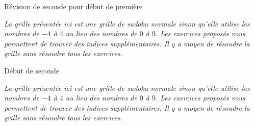 \documentclass[a4paper,12pt]{book}
\newcommand{\IntroSudoku}[1]{
\begin{center}
    {\large #1}

    \emph{La grille présentée ici est une grille de sudoku normale sinon qu'elle utilise les nombres de \( -4\) à \( 4\) au lieu des nombres de \( 0\) à \( 9\). Les exercices proposés vous permettent de trouver des indices supplémentaires. Il y a moyen de résoudre la grille sans résoudre tous les exercices.}
\end{center}
}
\begin{document}
\newpage

\IntroSudoku{Révision de seconde pour début de première}

\clearpage

\IntroSudoku{Début de seconde}

\end{document}
